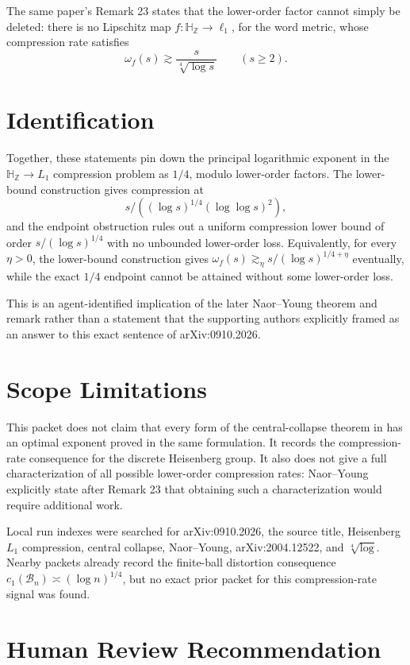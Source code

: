\documentclass[11pt]{article}
\begin{document}
The same paper's Remark 23 states that the lower-order factor cannot simply
be deleted: there is no Lipschitz map
\(f:\mathbb H_{\mathbb Z}\to\ell_1\), for the word metric, whose compression
rate satisfies
\[
  \omega_f(s)\gtrsim \frac{s}{\sqrt[4]{\log s}}
  \qquad (s\ge 2).
\]

\section*{Identification}

Together, these statements pin down the principal logarithmic exponent in the
\(\mathbb H_{\mathbb Z}\to L_1\) compression problem as \(1/4\), modulo
lower-order factors.  The lower-bound construction gives compression at
\[
  s/((\log s)^{1/4}(\log\log s)^2),
\]
and the endpoint obstruction rules out a uniform compression lower bound of
order \(s/(\log s)^{1/4}\) with no unbounded lower-order loss.  Equivalently,
for every \(\eta>0\), the lower-bound construction gives
\(\omega_f(s)\gtrsim_\eta s/(\log s)^{1/4+\eta}\) eventually, while the
exact \(1/4\) endpoint cannot be attained without some lower-order loss.

This is an agent-identified implication of the later Naor--Young theorem and
remark rather than a statement that the supporting authors explicitly framed
as an answer to this exact sentence of arXiv:0910.2026.

\section*{Scope Limitations}

This packet does not claim that every form of the central-collapse theorem in
\cite{CKN} has an optimal exponent proved in the same formulation.  It records
the compression-rate consequence for the discrete Heisenberg group.  It also
does not give a full characterization of all possible lower-order compression
rates: Naor--Young explicitly state after Remark 23 that obtaining such a
characterization would require additional work.

Local run indexes were searched for arXiv:0910.2026, the source title,
Heisenberg \(L_1\) compression, central collapse, Naor--Young, arXiv:2004.12522,
and \(\sqrt[4]{\log}\).  Nearby packets already record the finite-ball
distortion consequence \(c_1(\mathcal B_n)\asymp(\log n)^{1/4}\), but no exact
prior packet for this compression-rate signal was found.

\section*{Human Review Recommendation}
\end{document}
